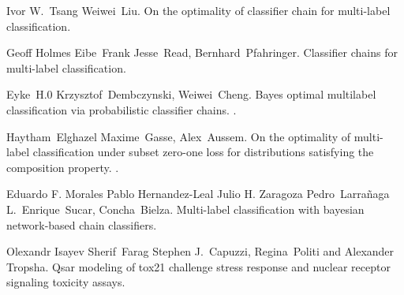 \documentclass{ITaSconf}
\begin{document}
\begin{thebibliography}{99}
	Ivor W.~Tsang Weiwei~Liu.
	\newblock On the optimality of classifier chain for multi-label classification.
	
	Geoff Holmes Eibe~Frank Jesse~Read, Bernhard~Pfahringer.
	\newblock Classifier chains for multi-label classification.
	
	Eyke~H.0 Krzysztof~Dembczynski, Weiwei~Cheng.
	\newblock Bayes optimal multilabel classification via probabilistic classifier
	chains.
	.
	
	Haytham~Elghazel Maxime~Gasse, Alex~Aussem.
	\newblock On the optimality of multi-label classification under subset zero-one
	loss for distributions satisfying the composition property.
	.
	
	Eduardo F. Morales Pablo Hernandez-Leal Julio H. Zaragoza Pedro~Larrañaga
	L.~Enrique~Sucar, Concha~Bielza.
	\newblock Multi-label classification with bayesian network-based chain
	classifiers.
	
	Olexandr Isayev Sherif~Farag Stephen J.~Capuzzi, Regina~Politi and Alexander
	Tropsha.
	\newblock Qsar modeling of tox21 challenge stress response and nuclear receptor
	signaling toxicity assays.
	
\end{thebibliography}
\end{document}
